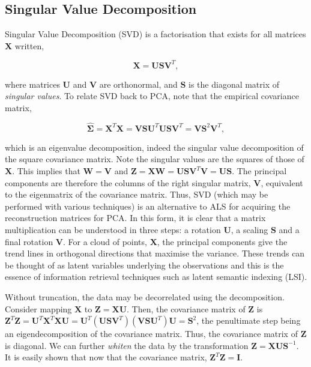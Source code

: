 \documentclass[11pt]{amsart}
\begin{document}
\subsection{Singular Value Decomposition}

Singular Value Decomposition (SVD) is a factorisation that exists for all matrices $\mathbf{X}$ written,

$$\mathbf{X} = \mathbf{U}\mathbf{S}\mathbf{V}^T,$$

where matrices $\mathbf{U}$ and $\mathbf{V}$ are orthonormal, and $\mathbf{S}$ is the diagonal matrix of \emph{singular values}. To relate SVD back to PCA, note that the empirical covariance matrix,

$$\hat{\boldsymbol\Sigma} = \mathbf{X}^T\mathbf{X} = \mathbf{V}\mathbf{S}\mathbf{U}^T\mathbf{U}\mathbf{S}\mathbf{V}^T =  \mathbf{V}\mathbf{S}^2\mathbf{V}^T,$$

which is an eigenvalue decomposition, indeed the singular value decomposition of the square covariance matrix. Note the singular values are the squares of those of $\mathbf{X}$. This implies that $\mathbf{W} = \mathbf{V}$ and $\mathbf{Z} = \mathbf{X}\mathbf{W} = \mathbf{U}\mathbf{S}\mathbf{V}^T\mathbf{V} = \mathbf{U}\mathbf{S}$. The principal components are therefore the columns of the right singular matrix, $\mathbf{V}$, equivalent to the eigenmatrix of the covariance matrix. Thus, SVD (which may be performed with various techniques) is an alternative to ALS for acquiring the reconstruction matrices for PCA. In this form, it is clear that a matrix multiplication can be understood in three steps: a rotation $\mathbf{U}$, a scaling $\mathbf{S}$ and a final rotation $\mathbf{V}$. For a cloud of points, $\mathbf{X}$, the principal components give the trend lines in orthogonal directions that maximise the variance. These trends can be thought of as latent variables underlying the observations and this is the essence of information retrieval techniques such as latent semantic indexing (LSI).

Without truncation, the data may be decorrelated using the decomposition. Consider mapping $\mathbf{X}$ to $\mathbf{Z} = \mathbf{X}\mathbf{U}$. Then, the covariance matrix of $\mathbf{Z}$ is $\mathbf{Z}^T\mathbf{Z} = \mathbf{U}^T\mathbf{X}^T\mathbf{X}\mathbf{U} = \mathbf{U}^T(\mathbf{U}\mathbf{S}\mathbf{V}^T)(\mathbf{V}\mathbf{S}\mathbf{U}^T)\mathbf{U} = \mathbf{S}^2$, the penultimate step being an eigendecomposition of the covariance matrix. Thus, the covariance matrix of $\mathbf{Z}$ is diagonal. We can further \emph{whiten} the data by the transformation $\mathbf{Z} = \mathbf{X}\mathbf{U}\mathbf{S}^{-1}$. It is easily shown that now that the covariance matrix, $\mathbf{Z}^T\mathbf{Z} = \mathbf{I}$.
\end{document}
